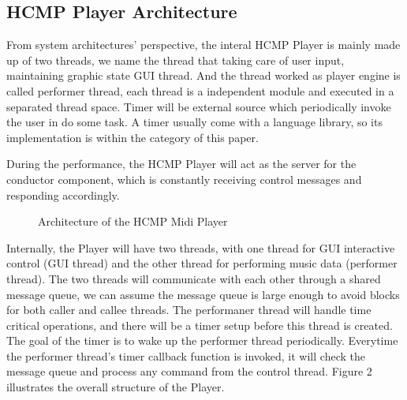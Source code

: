 
\subsection{HCMP Player Architecture}
From system architectures' perspective, the interal HCMP Player is mainly made up of
two threads, we name the thread that taking
care of user input, maintaining graphic state GUI thread. And the thread worked as   
player engine is called performer thread, each thread is a independent 
module and executed in a separated thread space. Timer will be external source 
which periodically invoke the user in do some task. A timer usually come with a 
language library, so its implementation is within the category of this paper.

During the performance, the HCMP Player will act as 
the server for the conductor component, which is constantly 
receiving control messages and responding accordingly. 

\begin{figure}[H]
\caption{Architecture of the HCMP Midi Player}
\label{fig:speciation}
\end{figure}

Internally, the Player will have two threads, with one thread for
GUI interactive control (GUI thread) and the other thread for 
performing music data (performer thread). 
The two threads will communicate with each other through a shared 
message queue, we can assume the message 
queue is large enough to avoid blocks for both caller and callee threads. 
The performaner thread
will handle time critical operations, and there will be a timer setup 
before this thread is created. The goal of the timer is to 
wake up the performer thread periodically. Everytime the performer 
thread's timer callback function is invoked, 
it will check the message queue and process any command from the control thread.
Figure 2 illustrates the overall structure of the Player.

